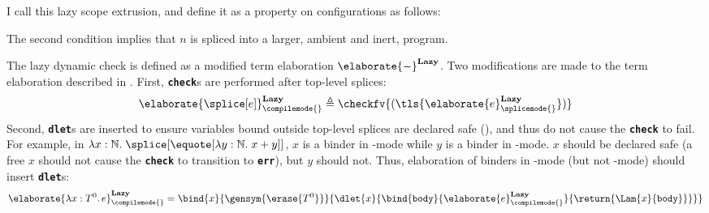I call this lazy scope extrusion, and define it as a property on \coreLang{} configurations as follows: 

The second condition implies that $n$ is spliced into a larger, ambient and inert, program. 

The lazy dynamic check is defined as a modified term elaboration ${\elaborate{-}}^{\textbf{Lazy}}$. Two modifications are made to the term elaboration described in . First, \textbf{\texttt{check}}s are performed after top-level splices:
\[\elaborate{\splice[e]}_{\compilemode{}}^{\textbf{Lazy}} \triangleq {\checkfv{(\tls{\elaborate{e}_{\splicemode{}}^{\textbf{Lazy}}})}}\]
Second, \textbf{\texttt{dlet}}s are inserted to ensure variables bound outside top-level splices are declared safe (), and thus do not cause the \textbf{\texttt{check}} to fail. For example, in $\lambda x:\mathbb{N}. \; \splice[{\equote[\lambda{y}: \mathbb{N}. \; x+y]}]$, $x$ is a binder in \compilemode{}-mode while $y$ is a binder in \quotemode{}-mode. $x$ should be declared safe (a free $x$ should not cause the \textbf{\texttt{check}} to transition to \textbf{\texttt{err}}), but $y$ should not. Thus, elaboration of binders in \compilemode{}-mode (but not \quotemode{}-mode) should insert \textbf{\texttt{dlet}}s:
{
  \footnotesize
\[\elaborate{\lambda x: T^0. \, e}_{\compilemode{}}^{\textbf{Lazy}} = \bind{x}{\gensym{\erase{T^0}}}{ \dlet{x}{\bind{\texttt{body}}{\elaborate{e}_{\compilemode{}}^\textbf{Lazy}}{\return{\Lam{x}{\texttt{body}}}}}}\]
}

